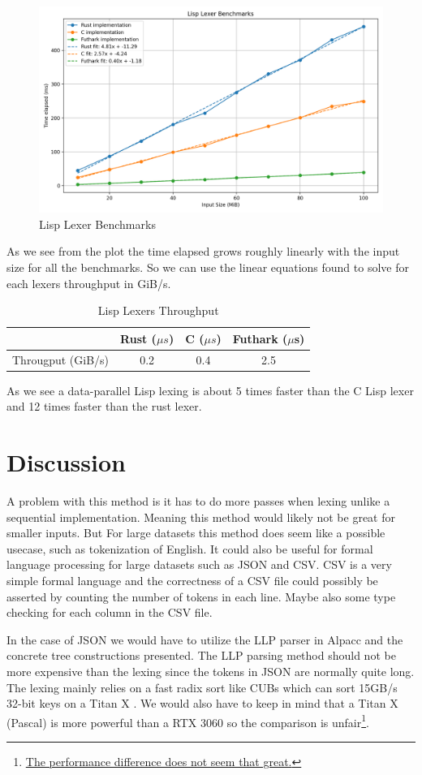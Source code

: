 \documentclass[a4paper,12pt]{article}
\theoremstyle{definition}
\begin{document}
\begin{figure}[H]
  \centering
  \includegraphics[width=\linewidth]{plot.png}
  \caption{Lisp Lexer Benchmarks}
\end{figure}
\noindent As we see from the plot the time elapsed grows roughly linearly with the input size for all the benchmarks. So we can use the linear equations found to solve for each lexers throughput in GiB/s.
\begin{table}[H]
  \centering
  \begin{tabular}{c|c|c|c}
     & Rust ($\mu s$) & C ($\mu s$) & Futhark ($\mu$s) \\ \hline
    Througput (GiB/s) & 0.2 & 0.4 & 2.5 \\
  \end{tabular}
  \caption{Lisp Lexers Throughput}
\end{table}
\noindent As we see a data-parallel Lisp lexing is about 5 times faster than the C Lisp lexer and 12 times faster than the rust lexer.
\section{Discussion}
A problem with this method is it has to do more passes when lexing unlike a sequential implementation. Meaning this method would likely not be great for smaller inputs. But For large datasets this method does seem like a possible usecase, such as tokenization of English. It could also be useful for formal language processing for large datasets such as JSON and CSV. CSV is a very simple formal language and the correctness of a CSV file could possibly be asserted by counting the number of tokens in each line. Maybe also some type checking for each column in the CSV file.

In the case of JSON we would have to utilize the LLP parser in Alpacc \cite{due2023} and the concrete tree constructions presented. The LLP parsing method should not be more expensive than the lexing since the tokens in JSON are normally quite long. The lexing mainly relies on a fast radix sort like CUBs which can sort 15GB/s 32-bit keys on a Titan X \cite{StehleJ16}. We would also have to keep in mind that a Titan X (Pascal) is more powerful than a RTX 3060 so the comparison is unfair\footnote{\href{https://gpu.userbenchmark.com/Compare/Nvidia-Titan-X-Pascal-vs-Nvidia-RTX-3060/m158352vs4105}{The performance difference does not seem that great.}}.
\end{document}
